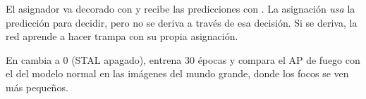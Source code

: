 \begin{aviso}
El asignador va decorado con  y recibe las predicciones
con . La asignación \emph{usa} la predicción para decidir, pero
no se deriva a través de esa decisión. Si se deriva, la red aprende a hacer
trampa con su propia asignación.
\end{aviso}

\begin{ejercicio}
En  cambia  a 0 (STAL apagado), entrena 30 épocas y
compara el AP de fuego con el del modelo normal en las imágenes del mundo grande,
donde los focos se ven más pequeños.
\end{ejercicio}
